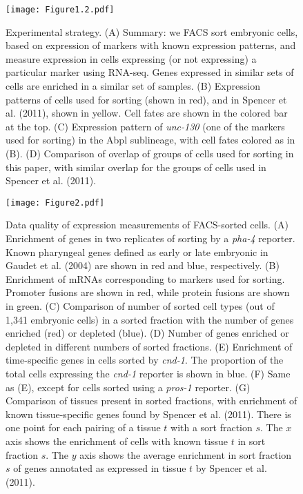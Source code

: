 \documentclass{article}
\begin{document}

\begin{figure}
\texttt{[image: Figure1.2.pdf]}
\caption{Experimental strategy.
(A) Summary: we FACS sort embryonic cells, based on expression of markers with known expression patterns, and measure expression in cells expressing (or not expressing) a particular marker using RNA-seq. Genes expressed in similar sets of cells are enriched in a similar set of samples.
(B) Expression patterns of cells used for sorting (shown in red), and in Spencer
et al. (2011), shown in yellow. Cell fates are shown in the colored bar at the
top.
(C) Expression pattern of {\em unc-130} (one of the markers used for sorting) in the Abpl sublineage, with cell fates colored as in (B).
(D) Comparison of overlap of groups of cells used for sorting in this paper, with similar overlap for the groups of cells used in Spencer et al. (2011).
}
\end{figure}
\clearpage

\begin{figure}
{\centering
\texttt{[image: Figure2.pdf]}
}
\caption{
Data quality of expression measurements of FACS-sorted cells.
(A) Enrichment of genes in two replicates of sorting by a {\em pha-4} reporter. Known pharyngeal genes defined as early or late embryonic in Gaudet et al. (2004) are shown in red and blue, respectively. (B) Enrichment of mRNAs corresponding to markers used for sorting. Promoter fusions are shown in red, while protein fusions are shown in green. (C) Comparison of number of sorted cell types (out of 1,341 embryonic cells) in a sorted fraction with the number of genes enriched (red) or depleted (blue). (D) Number of genes enriched or depleted in different numbers of sorted fractions. (E) Enrichment of time-specific genes in cells sorted by {\em cnd-1}. The proportion of the total cells expressing the {\em cnd-1} reporter is shown in blue. (F) Same as (E), except for cells sorted using a {\em pros-1} reporter. (G) Comparison of tissues present in sorted fractions, with enrichment of known tissue-specific genes found by Spencer et al. (2011).
There is one point for each pairing of a tissue $t$ with a sort fraction $s$.
The $x$ axis shows the enrichment of cells with known tissue $t$
 in sort fraction $s$. The $y$ axis shows the average enrichment in sort fraction $s$
of genes annotated as expressed in tissue $t$ by Spencer et al. (2011).
}
\end{figure}
\clearpage
\end{document}

